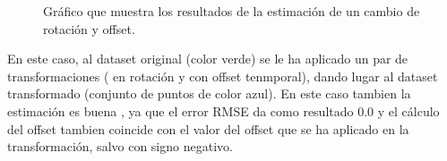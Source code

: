 \begin{figure}
\begin{center}
\hspace{0.5cm}

\end{center}

\caption{Gráfico que muestra los resultados de la estimación de un cambio de rotación y offset.}
\end{figure}

En este caso, al dataset original (color verde) se le ha aplicado un par de transformaciones ( en rotación y con offset tenmporal), dando lugar al dataset transformado (conjunto de puntos de color azul). En este caso tambien la estimación es buena , ya que el error RMSE da como resultado 0.0 y el cálculo del offset tambien coincide con el valor del offset que se ha aplicado en la transformación, salvo con signo negativo.



